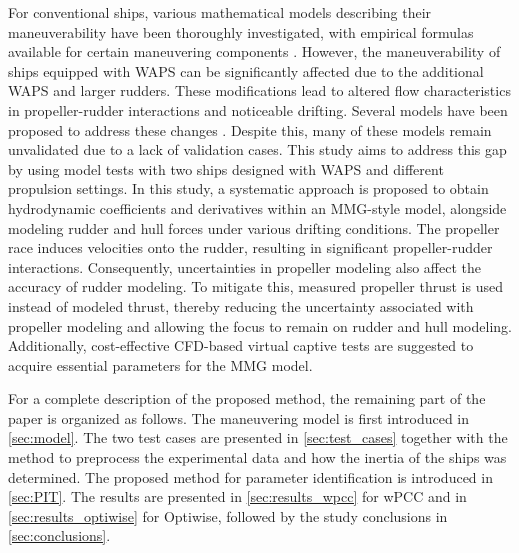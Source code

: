 For conventional ships, various mathematical models describing their maneuverability have been thoroughly investigated, with empirical formulas available for certain maneuvering components \citep{yasukawaIntroductionMMGStandard2015}. However, the maneuverability of ships equipped with WAPS can be significantly affected due to the additional WAPS and larger rudders. These modifications lead to altered flow characteristics in propeller-rudder interactions and noticeable drifting.
Several models have been proposed to address these changes \citep{violaNumericalMethodDesign2015,tillig4DOFSimulation2019,kjellbergSailingPerformanceWindPowered2023,guzelbulutInvestigationEfficiencyWindassisted2024a}. Despite this, many of these models remain unvalidated due to a lack of validation cases. This study aims to address this gap by using model tests with two ships designed with WAPS and different propulsion settings.
In this study, a systematic approach is proposed to obtain hydrodynamic coefficients and derivatives within an MMG-style model, alongside modeling rudder and hull forces under various drifting conditions. The propeller race induces velocities onto the rudder, resulting in significant propeller-rudder interactions. Consequently, uncertainties in propeller modeling also affect the accuracy of rudder modeling. To mitigate this, measured propeller thrust is used instead of modeled thrust, thereby reducing the uncertainty associated with propeller modeling and allowing the focus to remain on rudder and hull modeling. Additionally, cost-effective CFD-based virtual captive tests are suggested to acquire essential parameters for the MMG model. 

For a complete description of the proposed method, the remaining part of the paper is organized as follows. The maneuvering model is first introduced in \autoref{sec:model}. The two test cases are presented in \autoref{sec:test_cases} together with the method to preprocess the experimental data and how the inertia of the ships was determined. The proposed method for parameter identification is introduced in \autoref{sec:PIT}. The results are presented in \autoref{sec:results_wpcc} for wPCC and in \autoref{sec:results_optiwise} for Optiwise, followed by the study conclusions in \autoref{sec:conclusions}.



